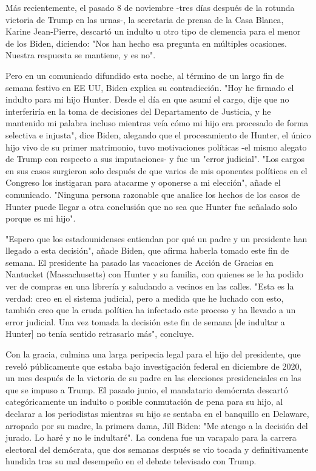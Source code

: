\documentclass[10pt,a4paper]{article}
\begin{document}
\par\medskip
M\'{a}s recientemente, el pasado 8 de noviembre -tres d\'{i}as despu\'{e}s de la rotunda victoria de Trump en las urnas-, la secretaria de prensa de la Casa Blanca, Karine Jean-Pierre, descart\'{o} un indulto u otro tipo de clemencia para el menor de los Biden, diciendo: "Nos han hecho esa pregunta en m\'{u}ltiples ocasiones. Nuestra respuesta se mantiene, y es no".
\par\medskip
Pero en un comunicado difundido esta noche, al t\'{e}rmino de un largo fin de semana festivo en EE UU, Biden explica su contradicci\'{o}n. "Hoy he firmado el indulto para mi hijo Hunter. Desde el d\'{i}a en que asum\'{i} el cargo, dije que no interferir\'{i}a en la toma de decisiones del Departamento de Justicia, y he mantenido mi palabra incluso mientras ve\'{i}a c\'{o}mo mi hijo era procesado de forma selectiva e injusta", dice Biden, alegando que el procesamiento de Hunter, el \'{u}nico hijo vivo de su primer matrimonio, tuvo motivaciones pol\'{i}ticas -el mismo alegato de Trump con respecto a sus imputaciones- y fue un "error judicial". "Los cargos en sus casos surgieron solo despu\'{e}s de que varios de mis oponentes pol\'{i}ticos en el Congreso los instigaran para atacarme y oponerse a mi elecci\'{o}n", a\~{n}ade el comunicado. "Ninguna persona razonable que analice los hechos de los casos de Hunter puede llegar a otra conclusi\'{o}n que no sea que Hunter fue se\~{n}alado solo porque es mi hijo".
\par\medskip
"Espero que los estadounidenses entiendan por qu\'{e} un padre y un presidente han llegado a esta decisi\'{o}n", a\~{n}ade Biden, que afirma haberla tomado este fin de semana. El presidente ha pasado las vacaciones de Acci\'{o}n de Gracias en Nantucket (Massachusetts) con Hunter y su familia, con quienes se le ha podido ver de compras en una librer\'{i}a y saludando a vecinos en las calles. "Esta es la verdad: creo en el sistema judicial, pero a medida que he luchado con esto, tambi\'{e}n creo que la cruda pol\'{i}tica ha infectado este proceso y ha llevado a un error judicial. Una vez tomada la decisi\'{o}n este fin de semana [de indultar a Hunter] no ten\'{i}a sentido retrasarlo m\'{a}s", concluye.
\par\medskip
Con la gracia, culmina una larga peripecia legal para el hijo del presidente, que revel\'{o} p\'{u}blicamente que estaba bajo investigaci\'{o}n federal en diciembre de 2020, un mes despu\'{e}s de la victoria de su padre en las elecciones presidenciales en las que se impuso a Trump. El pasado junio, el mandatario dem\'{o}crata descart\'{o} categ\'{o}ricamente un indulto o posible conmutaci\'{o}n de pena para su hijo, al declarar a los periodistas mientras su hijo se sentaba en el banquillo en Delaware, arropado por su madre, la primera dama, Jill Biden: "Me atengo a la decisi\'{o}n del jurado. Lo har\'{e} y no le indultar\'{e}". La condena fue un varapalo para la carrera electoral del dem\'{o}crata, que dos semanas despu\'{e}s se vio tocada y definitivamente hundida tras su mal desempe\~{n}o en el debate televisado con Trump.
\end{document}
